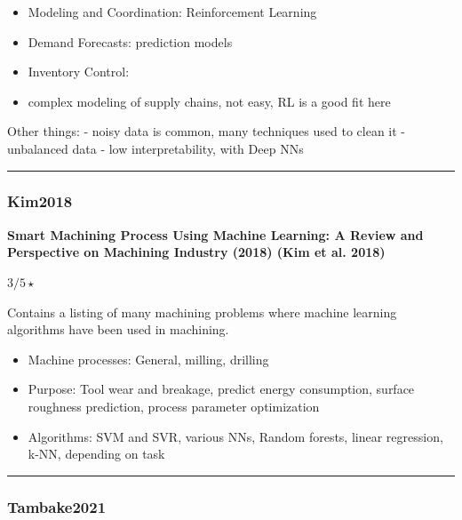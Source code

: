 \documentclass[
  letterpaper,
  DIV=11,
  numbers=noendperiod]{scrartcl}
\providecommand{\tightlist}{%
  \setlength{\itemsep}{0pt}\setlength{\parskip}{0pt}}
\begin{document}
\begin{enumerate}
  \begin{itemize}
  \tightlist
  \item
    Modeling and Coordination: Reinforcement Learning
  \item
    Demand Forecasts: prediction models
  \item
    Inventory Control:\\
  \item
    complex modeling of supply chains, not easy, RL is a good fit here
  \end{itemize}
\end{enumerate}

Other things: - noisy data is common, many techniques used to clean it -
unbalanced data - low interpretability, with Deep NNs

\begin{center}\rule{0.5\linewidth}{0.5pt}\end{center}

\subsubsection{Kim2018}\label{kim2018}

\textbf{Smart Machining Process Using Machine Learning: A Review and
Perspective on Machining Industry (2018) (Kim et al. 2018)}

\(3/5 \star\)

Contains a listing of many machining problems where machine learning
algorithms have been used in machining.

\begin{itemize}
\tightlist
\item
  Machine processes: General, milling, drilling
\item
  Purpose: Tool wear and breakage, predict energy consumption, surface
  roughness prediction, process parameter optimization
\item
  Algorithms: SVM and SVR, various NNs, Random forests, linear
  regression, k-NN, depending on task
\end{itemize}

\begin{center}\rule{0.5\linewidth}{0.5pt}\end{center}

\subsubsection{Tambake2021}\label{tambake2021}
\end{document}

